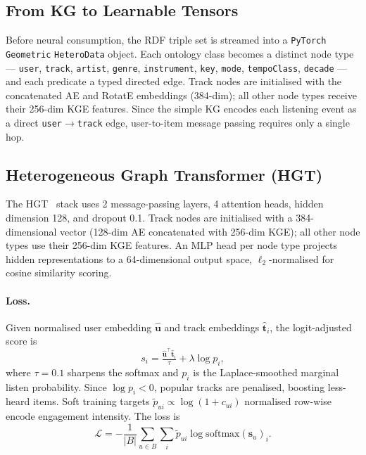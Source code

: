 \subsection{From KG to Learnable Tensors}

Before neural consumption, the RDF triple set is streamed into a \texttt{PyTorch Geometric} \texttt{HeteroData} object. Each ontology class becomes a distinct node type — \texttt{user}, \texttt{track}, \texttt{artist}, \texttt{genre}, \texttt{instrument}, \texttt{key}, \texttt{mode}, \texttt{tempoClass}, \texttt{decade} — and each predicate a typed directed edge. Track nodes are initialised with the concatenated AE and RotatE embeddings (384-dim); all other node types receive their 256-dim KGE features. Since the simple KG encodes each listening event as a direct \texttt{user}$\to$\texttt{track} edge, user-to-item message passing requires only a single hop.

\subsection{Heterogeneous Graph Transformer (HGT)}

The HGT~\cite{hu2020hgt} stack uses 2 message-passing layers, 4 attention heads, hidden dimension 128, and dropout 0.1. Track nodes are initialised with a 384-dimensional vector (128-dim AE concatenated with 256-dim KGE); all other node types use their 256-dim KGE features. An MLP head per node type projects hidden representations to a 64-dimensional output space, $\ell_2$-normalised for cosine similarity scoring.

\paragraph{Loss.} Given normalised user embedding $\hat{\mathbf{u}}$ and track embeddings $\hat{\mathbf{t}}_i$, the logit-adjusted score is
\begin{equation}
s_i = \tfrac{\hat{\mathbf{u}}^\top\hat{\mathbf{t}}_i}{\tau} + \lambda\log p_i,
\end{equation}
where $\tau{=}0.1$ sharpens the softmax and $p_i$ is the Laplace-smoothed marginal listen probability. Since $\log p_i<0$, popular tracks are penalised, boosting less-heard items. Soft training targets $\tilde{p}_{ui}\propto\log(1+c_{ui})$ normalised row-wise encode engagement intensity. The loss is
\begin{equation}
\mathcal{L}=-\frac{1}{|B|}\sum_{u\in B}\sum_i\tilde{p}_{ui}\log\mathrm{softmax}(\mathbf{s}_u)_i.
\end{equation}


